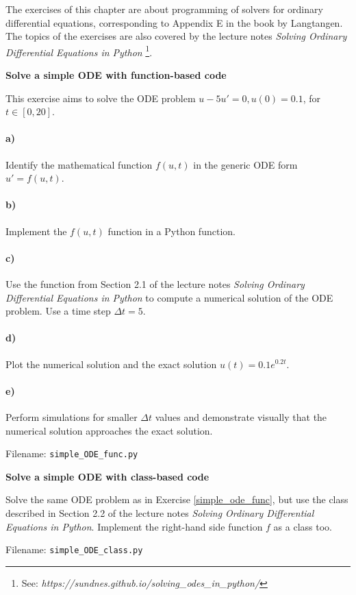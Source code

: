 The exercises of this chapter are about programming of solvers for ordinary differential
equations, corresponding to Appendix E in the book by Langtangen. The topics of the
exercises are also covered by the lecture notes
\emph{Solving Ordinary Differential Equations in Python}
\footnote{See: \emph{https://sundnes.github.io/solving_odes_in_python/}}.


\begin{Problem}{\textbf{Solve a simple ODE with function-based code}}\label{simple_ode_func}

\noindent
This exercise aims to solve the ODE problem $u - 5u' = 0, u(0) = 0.1$, for $t \in [0,20]$.
\paragraph{a)} Identify the mathematical function $f(u,t)$ in the generic ODE form $u' = f(u,t)$.
\paragraph{b)} Implement the $f(u,t)$ function in a Python function.
\paragraph{c)} Use the  function from Section 2.1 of the
lecture notes \emph{Solving Ordinary Differential Equations in Python} to compute a
numerical solution of the ODE problem. Use a time step $\Delta t = 5$.
\paragraph{d)} Plot the numerical solution and the exact solution $u(t) = 0.1e^{0.2t}$.
\paragraph{e)} Perform simulations for smaller $\Delta t$ values and demonstrate visually that the
numerical solution approaches the exact solution.

Filename: \texttt{simple\_ODE\_func.py}
\end{Problem}

\begin{Problem}{\textbf{Solve a simple ODE with class-based code}}\label{simple_ode_class}

\noindent
Solve the same ODE problem as in Exercise \ref{simple_ode_func}, but use the
 class described in Section 2.2 of the lecture
notes \emph{Solving Ordinary Differential Equations in Python}.
Implement the right-hand side function $f$ as a class too.

Filename: \texttt{simple\_ODE\_class.py}
\end{Problem}

